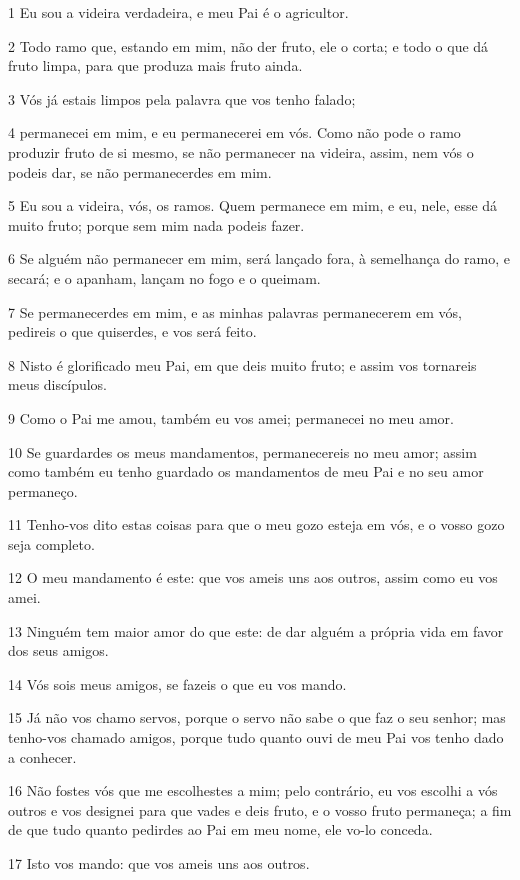\par 1 Eu sou a videira verdadeira, e meu Pai é o agricultor.
\par 2 Todo ramo que, estando em mim, não der fruto, ele o corta; e todo o que dá fruto limpa, para que produza mais fruto ainda.
\par 3 Vós já estais limpos pela palavra que vos tenho falado;
\par 4 permanecei em mim, e eu permanecerei em vós. Como não pode o ramo produzir fruto de si mesmo, se não permanecer na videira, assim, nem vós o podeis dar, se não permanecerdes em mim.
\par 5 Eu sou a videira, vós, os ramos. Quem permanece em mim, e eu, nele, esse dá muito fruto; porque sem mim nada podeis fazer.
\par 6 Se alguém não permanecer em mim, será lançado fora, à semelhança do ramo, e secará; e o apanham, lançam no fogo e o queimam.
\par 7 Se permanecerdes em mim, e as minhas palavras permanecerem em vós, pedireis o que quiserdes, e vos será feito.
\par 8 Nisto é glorificado meu Pai, em que deis muito fruto; e assim vos tornareis meus discípulos.
\par 9 Como o Pai me amou, também eu vos amei; permanecei no meu amor.
\par 10 Se guardardes os meus mandamentos, permanecereis no meu amor; assim como também eu tenho guardado os mandamentos de meu Pai e no seu amor permaneço.
\par 11 Tenho-vos dito estas coisas para que o meu gozo esteja em vós, e o vosso gozo seja completo.
\par 12 O meu mandamento é este: que vos ameis uns aos outros, assim como eu vos amei.
\par 13 Ninguém tem maior amor do que este: de dar alguém a própria vida em favor dos seus amigos.
\par 14 Vós sois meus amigos, se fazeis o que eu vos mando.
\par 15 Já não vos chamo servos, porque o servo não sabe o que faz o seu senhor; mas tenho-vos chamado amigos, porque tudo quanto ouvi de meu Pai vos tenho dado a conhecer.
\par 16 Não fostes vós que me escolhestes a mim; pelo contrário, eu vos escolhi a vós outros e vos designei para que vades e deis fruto, e o vosso fruto permaneça; a fim de que tudo quanto pedirdes ao Pai em meu nome, ele vo-lo conceda.
\par 17 Isto vos mando: que vos ameis uns aos outros.

